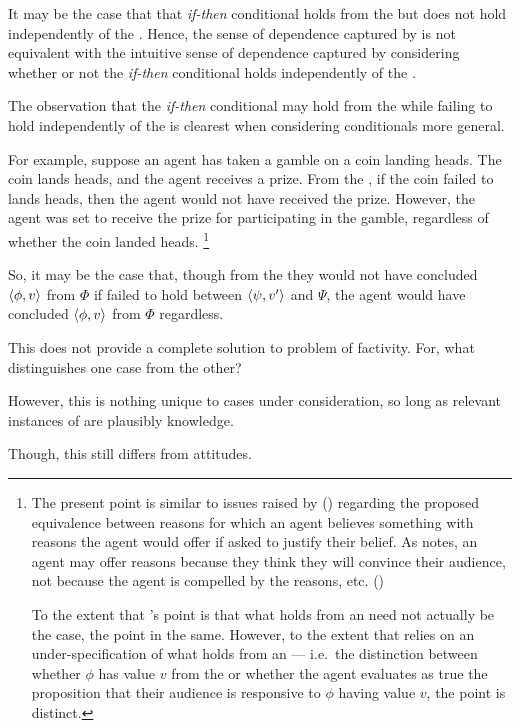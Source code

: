 \begin{note}
  It may be the case that that \emph{if-then} conditional holds from the \agpe{} but does not hold independently of the \agpe{}.
  Hence, the sense of dependence captured by \qWhyV{} is not equivalent with the intuitive sense of dependence captured by considering whether or not the \emph{if-then} conditional holds independently of the \agpe{}.

  The observation that the \emph{if-then} conditional may hold from the \agpe{} while failing to hold independently of the \agpe{} is clearest when considering conditionals more general.

  For example, suppose an agent has taken a gamble on a coin landing heads.
  The coin lands heads, and the agent receives a prize.
  From the \agpe{}, if the coin failed to lands heads, then the agent would not have received the prize.
  However, the agent was set to receive the prize for participating in the gamble, regardless of whether the coin landed heads.%
  \footnote{
    The present point is similar to issues raised by \citeauthor{Harman:1973ww} (\citeyear{Harman:1973ww}) regarding the proposed equivalence between reasons for which an agent believes something with reasons the agent would offer if asked to justify their belief.
  As \citeauthor{Harman:1973ww} notes, an agent may offer reasons because they think they will convince their audience, not because the agent is compelled by the reasons, etc.
  (\citeyear[Ch.2]{Harman:1973ww})

  To the extent that \citeauthor{Harman:1973ww}'s point is that what holds from an \agpe{} need not actually be the case, the point in the same.
  However, to the extent that \citeauthor{Harman:1973ww} relies on an under-specification of what holds from an \agpe{} --- i.e.\ the distinction between whether \(\phi\) has value \(v\) from the \agpe{} or whether the agent evaluates as true the proposition that their audience is responsive to \(\phi\) having value \(v\), the point is distinct.
  }

  So, it may be the case that, though from the \agpe{} they would not have concluded \(\langle \phi, v \rangle\) from \(\Phi\) if \support{} failed to hold between \(\langle \psi, v' \rangle\) and \(\Psi\), the agent would have concluded \(\langle \phi, v \rangle\) from \(\Phi\) regardless.
\end{note}

\begin{note}
  This does not provide a complete solution to problem of factivity.
  For, what distinguishes one case from the other?

  However, this is nothing unique to cases under consideration, so long as relevant instances of \fc{} are plausibly knowledge.

  Though, this still differs from attitudes.
\end{note}




